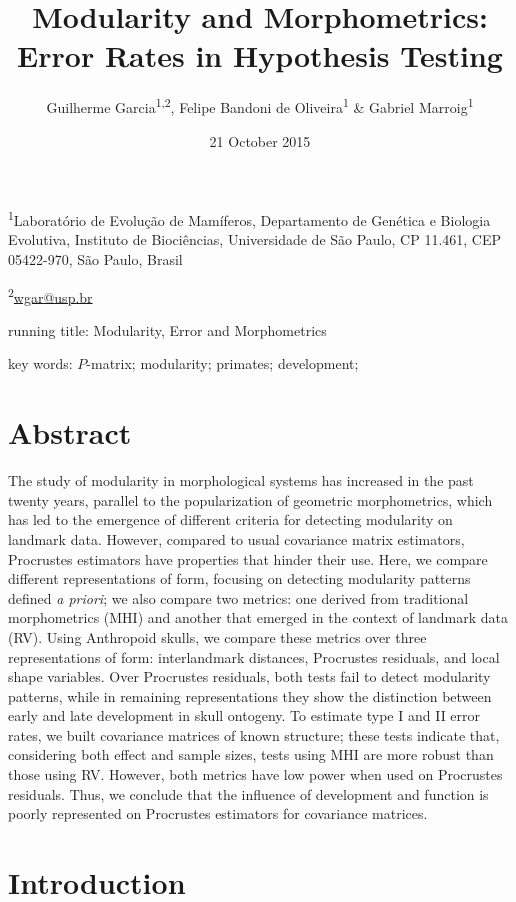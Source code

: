 \documentclass[12pt,]{article}
\title{Modularity and Morphometrics: Error Rates in Hypothesis Testing}
\author{Guilherme Garcia\textsuperscript{1,2}, Felipe Bandoni de
Oliveira\textsuperscript{1} \& Gabriel Marroig\textsuperscript{1}}
\date{21 October 2015}
\begin{document}
\maketitle


\linenumbers
\modulolinenumbers[2]

\onehalfspacing

\textsuperscript{1}Laboratório de Evolução de Mamíferos, Departamento de
Genética e Biologia Evolutiva, Instituto de Biociências, Universidade de
São Paulo, CP 11.461, CEP 05422-970, São Paulo, Brasil

\textsuperscript{2}\href{mailto:wgar@usp.br}{wgar@usp.br}

running title: Modularity, Error and Morphometrics

key words: $P$-matrix; modularity; primates; development;

\section{Abstract}\label{abstract}

The study of modularity in morphological systems has increased in the
past twenty years, parallel to the popularization of geometric
morphometrics, which has led to the emergence of different criteria for
detecting modularity on landmark data. However, compared to usual
covariance matrix estimators, Procrustes estimators have properties that
hinder their use. Here, we compare different representations of form,
focusing on detecting modularity patterns defined \emph{a priori}; we
also compare two metrics: one derived from traditional morphometrics
(MHI) and another that emerged in the context of landmark data (RV).
Using Anthropoid skulls, we compare these metrics over three
representations of form: interlandmark distances, Procrustes residuals,
and local shape variables. Over Procrustes residuals, both tests fail to
detect modularity patterns, while in remaining representations they show
the distinction between early and late development in skull ontogeny. To
estimate type I and II error rates, we built covariance matrices of
known structure; these tests indicate that, considering both effect and
sample sizes, tests using MHI are more robust than those using RV.
However, both metrics have low power when used on Procrustes residuals.
Thus, we conclude that the influence of development and function is
poorly represented on Procrustes estimators for covariance matrices.

\section{Introduction}\label{introduction}
\end{document}
